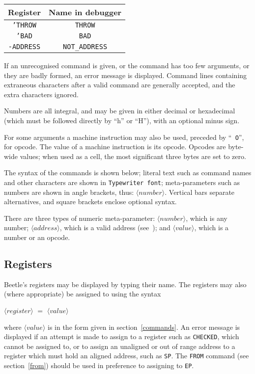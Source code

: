 \documentclass[english]{article}
\newcommand{\angb}[1]{$\langle #1\rangle$}
\begin{document}
\begin{center}
\begin{tabular}{cc} \toprule
\bf Register & \bf Name in debugger \\ \midrule
{\tt 'THROW} & {\tt THROW} \\
{\tt 'BAD} & {\tt BAD} \\
{\tt -ADDRESS} & {\tt NOT\_ADDRESS} \\ \bottomrule
\end{tabular}
\end{center}

If an unrecognised command is given, or the command has too few arguments, or
they are badly formed, an error message is displayed. Command lines
containing extraneous characters after a valid command are generally
accepted, and the extra characters ignored.

Numbers are all integral, and may be given in either decimal or hexadecimal
(which must be followed directly by ``h'' or ``H''), with an optional minus
sign.

For some arguments a machine instruction may also be used, preceded by ``{\tt
O}'', for opcode. The value of a machine instruction is its opcode. Opcodes
are byte-wide values; when used as a cell, the most significant three bytes
are set to zero.

The syntax of the commands is shown below; literal text such as command names
and other characters are shown in {\tt Typewriter font}; meta-parameters such
as numbers are shown in angle brackets, thus: \angb{number}. Vertical bars
separate alternatives, and square brackets enclose optional syntax.

There are three types of numeric meta-parameter: \angb{number}, which is any
number; \angb{address}, which is a valid address (see~\cite[section~\ref{exceptions}]{beetle});
and \angb{value}, which is a number or an opcode.

\subsection{Registers}

Beetle's registers may be displayed by typing their name. The
registers may also (where appropriate) be assigned to using the syntax

\begin{center}\angb{register} $=$ \angb{value}\end{center}

where \angb{value} is in the form given in section~\ref{commands}. An error
message is displayed if an attempt is made to assign to a register such as
{\tt CHECKED}, which cannot be assigned to, or to assign an unaligned or out
of range address to a register which must hold an aligned address, such as
{\tt SP}. The {\tt FROM} command (see section~\ref{from}) should be used in
preference to assigning to {\tt EP}.
\end{document}
